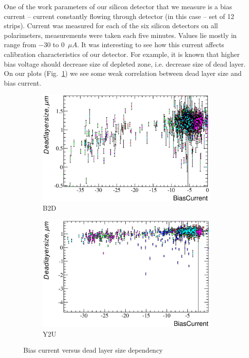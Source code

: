 \documentclass[a4paper]{article}
\begin{document}
One of the work parameters of our silicon detector that we measure is a bias current -- current
constantly flowing through detector (in this case -- set of 12 strips). Current was measured
for each of the six silicon detectors on all polarimeters, measurements were taken each five
minutes. Values lie mostly in range from $-30$ to $0$~$\mu A$. It was interesting to see how
this current affects calibration characteristics of our detector. For example, it is known 
that higher bias voltage should decrease size of depleted zone, i.e. decrease size of dead layer.
On our plots (Fig.~\ref{fig:bc_vs_xdl}) we see some weak correlation between dead layer size and bias
current.

\begin{figure}[p]
\begin{subfigure}[b]{0.5\textwidth}
\includegraphics[width=\textwidth]{gfx/run13_alpha_study/B2D/c_hBiasCurrent_DeadLayerSize.eps}
\caption{B2D}
\end{subfigure}
\begin{subfigure}[b]{0.5\textwidth}
\includegraphics[width=\textwidth]{gfx/run13_alpha_study/Y2U/c_hBiasCurrent_DeadLayerSize.eps}
\caption{Y2U}
\end{subfigure}
\caption{Bias current versus dead layer size dependency}
\label{fig:bc_vs_xdl}
\end{figure}
\end{document}
